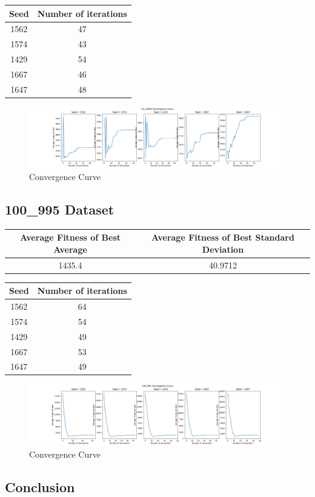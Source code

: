 \documentclass{article}
\begin{document}
\begin{center}
	\begin{tabular}{|c|c|}
		\hline
		Seed & Number of iterations \\
		\hline
		1562 & 47 \\
		\hline
		1574 & 43 \\
		\hline
		1429 & 54 \\
		\hline
		1667 & 46 \\
		\hline
		1647 & 48 \\
		\hline
	\end{tabular}
\end{center}

\begin{figure}[h!]
	\centering
	\includegraphics[width=\linewidth]{knapsack_23_10000.png}
	\caption{Convergence Curve}
\end{figure}

\subsection*{100\_995 Dataset}
\begin{center}
	\begin{tabular}{|c|c|}
		\hline
		Average Fitness of Best Average & Average Fitness of Best Standard Deviation \\
		\hline
		1435.4 & 40.9712 \\
		\hline
	\end{tabular}
\end{center}

\begin{center}
	\begin{tabular}{|c|c|}
		\hline
		Seed & Number of iterations \\
		\hline
		1562 & 64 \\
		\hline
		1574 & 54 \\
		\hline
		1429 & 49 \\
		\hline
		1667 & 53 \\
		\hline
		1647 & 49 \\
		\hline
	\end{tabular}
\end{center}

\begin{figure}[h!]
	\centering
	\includegraphics[width=\linewidth]{knapsack_100_995.png}
	\caption{Convergence Curve}
\end{figure}

\subsection*{Conclusion}



\end{document}
